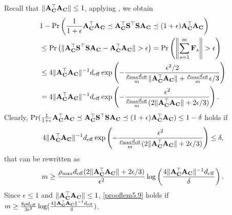 \documentclass[11pt,a4paper]{article}
\begin{document}
Recall that $\|\mathbf{A}_{\mathbf{C}}^\top\mathbf{A}_{\mathbf{C}}\| \leq 1$, applying , we obtain
\begin{align}
&1-\Pr \left(\frac{1}{1+\epsilon}\A_{\C}^{\top}\A_{\C}\preceq\A_{\C}^\top\S^\top\S\A_{\C}\preceq (1+\epsilon)\A_{\C}^\top\A_{\C} \right)  \nonumber\\
    &\leq   \Pr \left(\|\A_{\C}^\top\S^\top\S\A_{\C}-\A_{\C}^\top\A_{\C}\|>\epsilon \right)= \Pr \left( \left\|\sum_{s=1}^{m}\F_s \right\|>\epsilon \right) \notag\\
        &\leq 4 \|\A_{\C}^\top\A_{\C}\|^{-1}d_{\eff}\exp \left(-\frac{\epsilon^2/2}{\frac{\rho_{\max}  d_{\eff}}{m}\|\A_{\C}^\top\A_{\C}\|+\frac{\rho_{\max}  d_{\eff}}{m}\epsilon/3 } \right)\notag\\
        &=4 \|\A_{\C}^\top\A_{\C}\|^{-1}d_{\eff}\exp \left(-\frac{\epsilon^2}{\frac{\rho_{\max}  d_{\eff}}{m}( 2\|\A_{\C}^\top\A_{\C}\|+2\epsilon/3)} \right). \nonumber
\end{align}
Clearly,
 $\Pr(\frac{1}{1+\epsilon}\mathbf{A}_{\mathbf{C}}^{\top}\mathbf{A}_{\mathbf{C}}\preceq\mathbf{A}_{\mathbf{C}}^\top\mathbf{S}^\top\mathbf{S}\mathbf{A}_{\mathbf{C}}\preceq (1+\epsilon)\mathbf{A}_{\mathbf{C}}^\top\mathbf{A}_{\mathbf{C}})\leq1-\delta$ holds  if
\begin{align} \label{eq:error=delta}
4\|\mathbf{A}_{\mathbf{C}}^\top\mathbf{A}_{\mathbf{C}}\|^{-1}d_{\mathrm{eff}}\exp \left(-\frac{\epsilon^2}{\frac{\rho_{\max}  d_{\mathrm{eff}}}{m}( 2\|\mathbf{A}_{\mathbf{C}}^\top\mathbf{A}_{\mathbf{C}}\|+2\epsilon/3)} \right) \leq\delta,
\end{align}
that can be rewritten as
\begin{align}\label{prooflem5.9}
m\geq \frac{{\rho_{\max}  d_{\mathrm{eff}}}( 2\|\mathbf{A}_{\mathbf{C}}^\top\mathbf{A}_{\mathbf{C}}\|+2\epsilon/3)}{\epsilon^2}\log \left(\frac{4\|\mathbf{A}_{\mathbf{C}}^\top\mathbf{A}_{\mathbf{C}}\|^{-1}d_{\mathrm{eff}}}{\delta} \right).
\end{align}
Since $\epsilon\leq1$ and $\|\mathbf{A}_{\mathbf{C}}^\top\mathbf{A}_{\mathbf{C}}\|\leq 1$, \eqref{prooflem5.9} holds if $m\geq  \frac{8{\rho  d_{\mathrm{eff}}}}{3\epsilon^2}\log(\frac{4\|\mathbf{A}_{\mathbf{C}}^\top\mathbf{A}_{\mathbf{C}}\|^{-1}d_{\mathrm{eff}}}{\delta})$.
\end{document}
